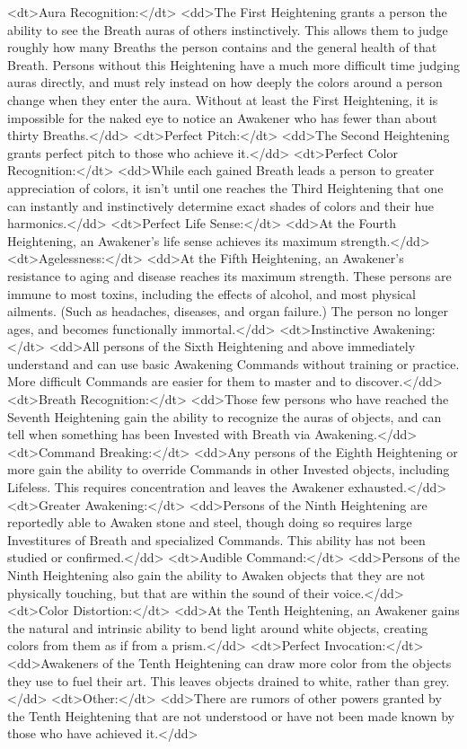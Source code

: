 <dt>Aura Recognition:</dt>
<dd>The First Heightening grants a person the ability to see the Breath auras of others instinctively. This allows them to judge roughly how many Breaths the person contains and the general health of that Breath. Persons without this Heightening have a much more difficult time judging auras directly, and must rely instead on how deeply the colors around a person change when they enter the aura. Without at least the First Heightening, it is impossible for the naked eye to notice an Awakener who has fewer than about thirty Breaths.</dd>
<dt>Perfect Pitch:</dt>
<dd>The Second Heightening grants perfect pitch to those who achieve it.</dd>
<dt>Perfect Color Recognition:</dt>
<dd>While each gained Breath leads a person to greater appreciation of colors, it isn’t until one reaches the Third Heightening that one can instantly and instinctively determine exact shades of colors and their hue harmonics.</dd>
<dt>Perfect Life Sense:</dt>
<dd>At the Fourth Heightening, an Awakener’s life sense achieves its maximum strength.</dd>
<dt>Agelessness:</dt>
<dd>At the Fifth Heightening, an Awakener’s resistance to aging and disease reaches its maximum strength. These persons are immune to most toxins, including the effects of alcohol, and most physical ailments. (Such as headaches, diseases, and organ failure.) The person no longer ages, and becomes functionally immortal.</dd>
<dt>Instinctive Awakening:</dt>
<dd>All persons of the Sixth Heightening and above immediately understand and can use basic Awakening Commands without training or practice. More difficult Commands are easier for them to master and to discover.</dd>
<dt>Breath Recognition:</dt>
<dd>Those few persons who have reached the Seventh Heightening gain the ability to recognize the auras of objects, and can tell when something has been Invested with Breath via Awakening.</dd>
<dt>Command Breaking:</dt>
<dd>Any persons of the Eighth Heightening or more gain the ability to override Commands in other Invested objects, including Lifeless. This requires concentration and leaves the Awakener exhausted.</dd>
<dt>Greater Awakening:</dt>
<dd>Persons of the Ninth Heightening are reportedly able to Awaken stone and steel, though doing so requires large Investitures of Breath and specialized Commands. This ability has not been studied or confirmed.</dd>
<dt>Audible Command:</dt>
<dd>Persons of the Ninth Heightening also gain the ability to Awaken objects that they are not physically touching, but that are within the sound of their voice.</dd>
<dt>Color Distortion:</dt>
<dd>At the Tenth Heightening, an Awakener gains the natural and intrinsic ability to bend light around white objects, creating colors from them as if from a prism.</dd>
<dt>Perfect Invocation:</dt>
<dd>Awakeners of the Tenth Heightening can draw more color from the objects they use to fuel their art. This leaves objects drained to white, rather than grey.</dd>
<dt>Other:</dt>
<dd>There are rumors of other powers granted by the Tenth Heightening that are not understood or have not been made known by those who have achieved it.</dd>

